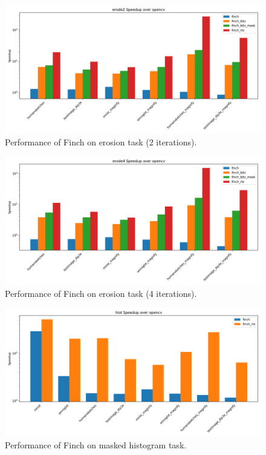 \begin{figure}
	\includegraphics[width=\linewidth]{erode2_speedup_over_opencv.png}
    \caption{Performance of Finch on erosion task (2 iterations).}
\end{figure}

\begin{figure}
	\includegraphics[width=\linewidth]{erode4_speedup_over_opencv.png}
    \caption{Performance of Finch on erosion task (4 iterations).}
\end{figure}

\begin{figure}
	\includegraphics[width=\linewidth]{hist_speedup_over_opencv.png}
    \caption{Performance of Finch on masked histogram task.}
\end{figure}

